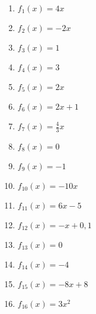 \begin{Answer}[ref=momAllgA1]

	\begin{minipage}{\textwidth}
		\begin{minipage}{0.5\textwidth}
			\begin{enumerate}[label=\alph*)]
				\item \(f_1(x)=4x\)
				\item \(f_2(x)=-2x\)
				\item \(f_3(x)=1\)
				\item \(f_4(x)=3\)
				\item \(f_5(x)=2x\)
				\item \(f_6(x)=2x+1\)
				\item \(f_7(x)=\frac{4}{3}x\)
				\item \(f_8(x)=0\)
			\end{enumerate}
		\end{minipage}%
		\begin{minipage}{0.5\textwidth}
			\begin{enumerate}[label=\alph*)]
				\setcounter{enumi}{8}
				\item \(f_9(x)=-1\)
				\item \(f_{10}(x)=-10x\)
				\item \(f_{11}(x)=6x-5\)
				\item \(f_{12}(x)=-x+0,1\)
				\item \(f_{13}(x)=0\)
				\item \(f_{14}(x)=-4\)
				\item \(f_{15}(x)=-8x+8\)
				\item \(f_{16}(x)=3x^2\)
			\end{enumerate}
		\end{minipage}%
	\end{minipage}
\end{Answer}